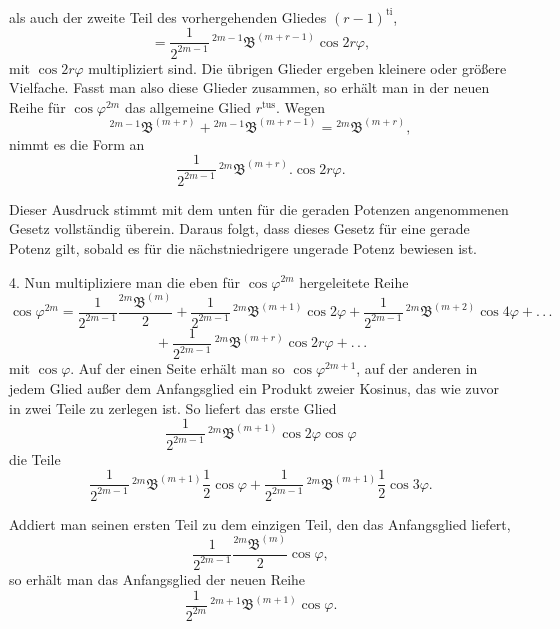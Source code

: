 als auch der zweite Teil des vorhergehenden Gliedes $(r-1)^{\text{ti}}$,
\[
= \frac{1}{2^{2m-1}}\,{}^{2m-1}\mathfrak{B}^{(m+r-1)}\cos 2r\varphi,
\]
mit $\cos 2r\varphi$ multipliziert sind. Die übrigen Glieder ergeben kleinere oder größere Vielfache. Fasst man also diese Glieder zusammen, so erhält man in der neuen Reihe für $\cos\varphi^{2m}$ das allgemeine Glied $r^{\text{tus}}$. Wegen
\[
{}^{2m-1}\mathfrak{B}^{(m+r)} + {}^{2m-1}\mathfrak{B}^{(m+r-1)} = {}^{2m}\mathfrak{B}^{(m+r)},
\]
nimmt es die Form an
\[
\frac{1}{2^{2m-1}}\,{}^{2m}\mathfrak{B}^{(m+r)} . \cos 2r\varphi.
\]

\par\noindent Dieser Ausdruck stimmt mit dem unten für die geraden Potenzen angenommenen Gesetz vollständig überein. Daraus folgt, dass dieses Gesetz für eine gerade Potenz gilt, sobald es für die nächstniedrigere ungerade Potenz bewiesen ist.

4. Nun multipliziere man die eben für $\cos\varphi^{2m}$ hergeleitete Reihe
\[
\cos\varphi^{2m} = \frac{1}{2^{2m-1}}\frac{{}^{2m}\mathfrak{B}^{(m)}}{2}
+ \frac{1}{2^{2m-1}}\,{}^{2m}\mathfrak{B}^{(m+1)}\cos 2\varphi
+ \frac{1}{2^{2m-1}}\,{}^{2m}\mathfrak{B}^{(m+2)}\cos 4\varphi + .\,.\,.
\]
\[
{} + \frac{1}{2^{2m-1}}\,{}^{2m}\mathfrak{B}^{(m+r)}\cos 2r\varphi + .\,.\,.
\]
mit $\cos\varphi$. Auf der einen Seite erhält man so $\cos\varphi^{2m+1}$, auf der anderen in jedem Glied außer dem Anfangsglied ein Produkt zweier Kosinus, das wie zuvor in zwei Teile zu zerlegen ist. So liefert das erste Glied
\[
\frac{1}{2^{2m-1}}\,{}^{2m}\mathfrak{B}^{(m+1)}\cos 2\varphi\cos\varphi
\]
die Teile
\[
\frac{1}{2^{2m-1}}\,{}^{2m}\mathfrak{B}^{(m+1)}\frac{1}{2}\cos\varphi
+ \frac{1}{2^{2m-1}}\,{}^{2m}\mathfrak{B}^{(m+1)}\frac{1}{2}\cos 3\varphi.
\]

\par\noindent Addiert man seinen ersten Teil zu dem einzigen Teil, den das Anfangsglied liefert,
\[
\frac{1}{2^{2m-1}}\frac{{}^{2m}\mathfrak{B}^{(m)}}{2}\cos\varphi,
\]
so erhält man das Anfangsglied der neuen Reihe
\[
\frac{1}{2^{2m}}\,{}^{2m+1}\mathfrak{B}^{(m+1)}\cos\varphi.
\]

